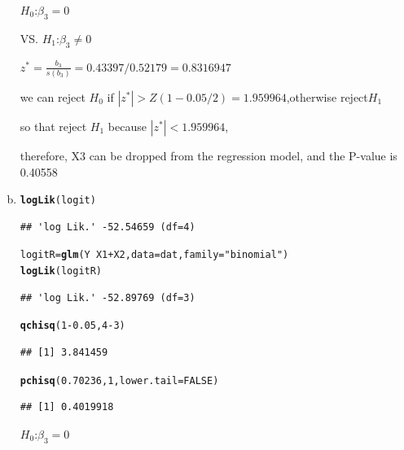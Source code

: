 \documentclass{article}\usepackage[]{graphicx}\usepackage[]{color}
\makeatletter
\newcommand{\hlnum}[1]{\textcolor[rgb]{0.686,0.059,0.569}{#1}}%
\newcommand{\hlstr}[1]{\textcolor[rgb]{0.192,0.494,0.8}{#1}}%
\newcommand{\hlopt}[1]{\textcolor[rgb]{0,0,0}{#1}}%
\newcommand{\hlstd}[1]{\textcolor[rgb]{0.345,0.345,0.345}{#1}}%
\newcommand{\hlkwb}[1]{\textcolor[rgb]{0.69,0.353,0.396}{#1}}%
\newcommand{\hlkwc}[1]{\textcolor[rgb]{0.333,0.667,0.333}{#1}}%
\newcommand{\hlkwd}[1]{\textcolor[rgb]{0.737,0.353,0.396}{\textbf{#1}}}%
\newenvironment{kframe}{%
 \def\at@end@of@kframe{}%
 \ifinner\ifhmode%
  \def\at@end@of@kframe{\end{minipage}}%
  \begin{minipage}{\columnwidth}%
 \fi\fi%
 \def\FrameCommand##1{\hskip\@totalleftmargin \hskip-\fboxsep
 \colorbox{shadecolor}{##1}\hskip-\fboxsep
     \hskip-\linewidth \hskip-\@totalleftmargin \hskip\columnwidth}%
 \MakeFramed {\advance\hsize-\width
   \@totalleftmargin\z@ \linewidth\hsize
   \@setminipage}}%
 {\par\unskip\endMakeFramed%
 \at@end@of@kframe}
\newenvironment{knitrout}{}{} %
\makeatother
\begin{document}
\begin{enumerate}[(a)]
\begin{center}
$H_0$:$\beta_3=0$

VS. $H_1$:$\beta_3 \ne 0$

$z^*=\frac{b_3}{s(b_3)} = 0.43397/0.52179   = 0.8316947$

we can reject $H_0$ if $|z^*| > Z(1-0.05/2)=1.959964$,otherwise reject$H_1$

so that reject $H_1$ because $|z^*|<1.959964$,

therefore, X3 can be dropped from the regression model, and the P-value is 0.40558  
\end{center}

\item

\begin{knitrout}
\color{fgcolor}\begin{kframe}
\begin{alltt}
  \hlkwd{logLik}\hlstd{(logit)}
\end{alltt}
\begin{verbatim}
## 'log Lik.' -52.54659 (df=4)
\end{verbatim}
\begin{alltt}
  \hlstd{logitR} \hlkwb{=} \hlkwd{glm}\hlstd{(Y} \hlopt{~} \hlstd{X1}\hlopt{+}\hlstd{X2,} \hlkwc{data} \hlstd{= dat,} \hlkwc{family} \hlstd{=} \hlstr{"binomial"}\hlstd{)}
  \hlkwd{logLik}\hlstd{(logitR)}
\end{alltt}
\begin{verbatim}
## 'log Lik.' -52.89769 (df=3)
\end{verbatim}
\begin{alltt}
  \hlkwd{qchisq}\hlstd{(}\hlnum{1}\hlopt{-}\hlnum{0.05}\hlstd{,} \hlnum{4}\hlopt{-}\hlnum{3}\hlstd{)}
\end{alltt}
\begin{verbatim}
## [1] 3.841459
\end{verbatim}
\begin{alltt}
  \hlkwd{pchisq}\hlstd{(}\hlnum{0.70236}\hlstd{,} \hlnum{1}\hlstd{,} \hlkwc{lower.tail} \hlstd{=} \hlnum{FALSE}\hlstd{)}
\end{alltt}
\begin{verbatim}
## [1] 0.4019918
\end{verbatim}
\end{kframe}
\end{knitrout}

\begin{center}
$H_0$:$\beta_3=0$


\end{center}
\end{enumerate}
\end{document}
